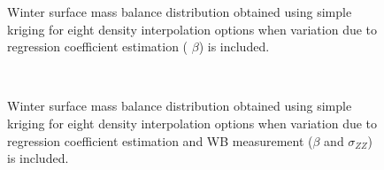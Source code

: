 \documentclass{sfuthesis}
\begin{document}
\begin{appendices}
\begin{figure}[H]
	\caption[]{Winter surface mass balance distribution obtained using simple kriging for eight density interpolation options when variation due to regression coefficient estimation ( $\beta$) is included. }
	\label{fig:WSMB_SK_Distributionbeta}
\end{figure}
\begin{figure}[H]
	\centering
	\\
	\caption[]{Winter surface mass balance distribution obtained using simple kriging for eight density interpolation options when variation due to regression coefficient estimation and WB measurement ($\beta$ and $\sigma_{ZZ}$) is included. }
	\label{fig:WSMB_SK_DistributionbetaNzz}
\end{figure}


\end{appendices}
\end{document}
